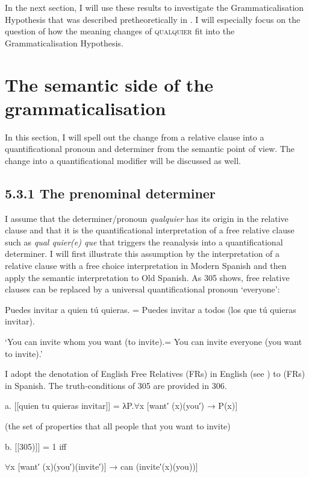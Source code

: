  In the next section, I will use these results to investigate the Grammaticalisation Hypothesis that was described pretheoretically in . I will especially focus on the question of how the meaning changes of \textsc{qualquier} fit into the Grammaticalisation Hypothesis.

\section{The semantic side of the grammaticalisation}

In this section, I will spell out the change from a relative clause into a quantificational pronoun and determiner from the semantic point of view. The change into a quantificational modifier will be discussed as well.

\subsection{\textbf{5.3.1} \textbf{The} \textbf{prenominal} \textbf{determiner}}

  I assume that the determiner/pronoun \textit{qualquier} has its origin in the relative clause and that it is the quantificational interpretation of a free relative clause such as \textit{qual quier(e) que} that triggers the reanalysis into a quantificational determiner. I will first illustrate this assumption by the interpretation of a relative clause with a free choice interpretation in Modern Spanish and then apply the semantic interpretation to Old Spanish. As 305 shows, free relative clauses can be replaced by a universal quantificational pronoun ‘everyone’:

  Puedes invitar a quien tú quieras. = Puedes invitar a todos (los que tú quieras invitar).

    ‘You can invite whom you want (to invite).= You can invite everyone (you want to invite).’

I adopt the denotation of English Free Relatives (FRs) in English (see \citealt{Šimík2018}) to (FRs) in Spanish. The truth-conditions of 305 are provided in 306.

  a.  [[quien tu quieras invitar]] = λP.${\forall}$x [want′ (x)(you′) → P(x)]

(the set of properties that all people that you want to invite)

  b.  [[305)]] = 1 iff

{${\forall}$x [want′ (x)(you′)(invite′)] → can (invite′(x)(you))]}

